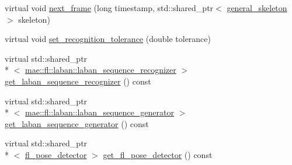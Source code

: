 \begin{DoxyCompactItemize}
\item 
virtual void \hyperlink{classmae_1_1fl_1_1fl__movement__controller_a3eafa33ebaf85a140bcafdd1670b368c}{next\-\_\-frame} (long timestamp, std\-::shared\-\_\-ptr$<$ \hyperlink{classmae_1_1general__skeleton}{general\-\_\-skeleton} $>$ skeleton)
\item 
virtual void \hyperlink{classmae_1_1fl_1_1fl__movement__controller_a0bdd94f763b740c612475df629dc3bcf}{set\-\_\-recognition\-\_\-tolerance} (double tolerance)
\item 
virtual std\-::shared\-\_\-ptr\\*
$<$ \hyperlink{classmae_1_1fl_1_1laban_1_1laban__sequence__recognizer}{mae\-::fl\-::laban\-::laban\-\_\-sequence\-\_\-recognizer} $>$ \hyperlink{classmae_1_1fl_1_1fl__movement__controller_abaacf2be62b0194ee6ffcac844a09d22}{get\-\_\-laban\-\_\-sequence\-\_\-recognizer} () const 
\item 
virtual std\-::shared\-\_\-ptr\\*
$<$ \hyperlink{classmae_1_1fl_1_1laban_1_1laban__sequence__generator}{mae\-::fl\-::laban\-::laban\-\_\-sequence\-\_\-generator} $>$ \hyperlink{classmae_1_1fl_1_1fl__movement__controller_a4f4390073c34aa18b55a57c447c84542}{get\-\_\-laban\-\_\-sequence\-\_\-generator} () const 
\item 
virtual std\-::shared\-\_\-ptr\\*
$<$ \hyperlink{classmae_1_1fl_1_1fl__pose__detector}{fl\-\_\-pose\-\_\-detector} $>$ \hyperlink{classmae_1_1fl_1_1fl__movement__controller_a0d25a3e53c47e1cb1f0eb3cd7df07548}{get\-\_\-fl\-\_\-pose\-\_\-detector} () const 
\end{DoxyCompactItemize}



